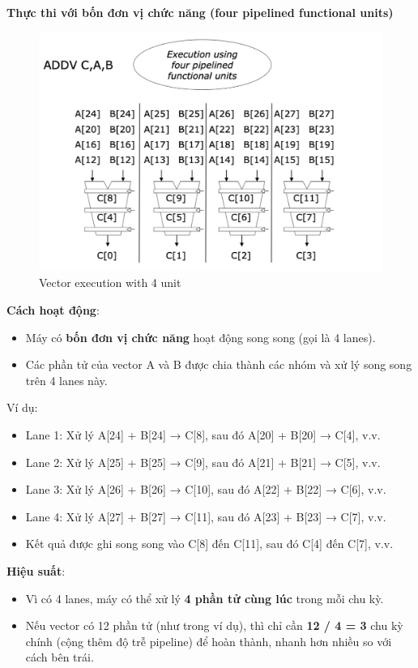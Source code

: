 \documentclass[a4paper]{article}
\begin{document}
\textbf{Thực thi với bốn đơn vị chức năng (four pipelined functional units)}

\begin{multicols}{2}
\begin{figure}[H]
    \centering
    \includegraphics[width=1\linewidth]{assets/vector-execution-2.png}
    \caption{Vector execution with 4 unit}
    \label{fig:enter-label}
\end{figure}
\columnbreak
\textbf{Cách hoạt động}:
\begin{itemize}
    \item Máy có \textbf{bốn đơn vị chức năng} hoạt động song song (gọi là 4 lanes).
    \item Các phần tử của vector A và B được chia thành các nhóm và xử lý song song trên 4 lanes này.
\end{itemize}
Ví dụ:
\begin{itemize}
    \item Lane 1: Xử lý A[24] + B[24] → C[8], sau đó A[20] + B[20] → C[4], v.v.
    \item Lane 2: Xử lý A[25] + B[25] → C[9], sau đó A[21] + B[21] → C[5], v.v.
    \item Lane 3: Xử lý A[26] + B[26] → C[10], sau đó A[22] + B[22] → C[6], v.v.
    \item Lane 4: Xử lý A[27] + B[27] → C[11], sau đó A[23] + B[23] → C[7], v.v.
    \item Kết quả được ghi song song vào C[8] đến C[11], sau đó C[4] đến C[7], v.v.
\end{itemize}
\textbf{Hiệu suất}:
\begin{itemize}
    \item Vì có 4 lanes, máy có thể xử lý \textbf{4 phần tử cùng lúc} trong mỗi chu kỳ.
    \item Nếu vector có 12 phần tử (như trong ví dụ), thì chỉ cần \textbf{12 / 4 = 3} chu kỳ chính (cộng thêm độ trễ pipeline) để hoàn thành, nhanh hơn nhiều so với cách bên trái.
\end{itemize}
\end{multicols}
\end{document}
